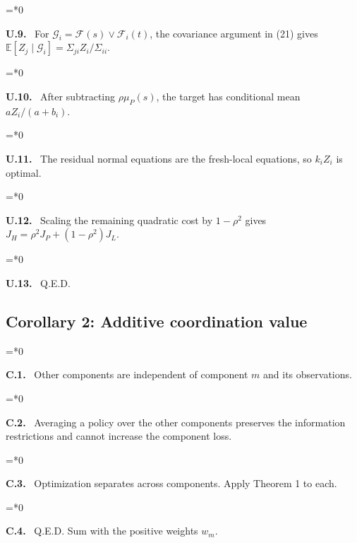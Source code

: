 \documentclass[11pt,letterpaper]{article}
\newcommand{\E}{\mathbb E}
\newenvironment{proofstep}[2]{%
  \begin{list}{}{\leftmargin=\dimexpr 0.17in*#2\relax%
  \setlength{\rightmargin}{0pt}\setlength{\topsep}{5pt}\setlength{\parsep}{2pt}}%
  \item[]\textbf{\textcolor{ink}{#1.}}\ }{\end{list}}
\begin{document}
\begin{proofstep}{U.9}{0}
For $\mathcal G_i=\mathcal F(s)\vee\mathcal F_i(t)$, the covariance argument in (21) gives $\E[Z_j\mid\mathcal G_i]=\Sigma_{ji}Z_i/\Sigma_{ii}$.
\par\nopagebreak{}
\end{proofstep}
\begin{proofstep}{U.10}{0}
After subtracting $\rho\mu_P(s)$, the target has conditional mean $aZ_i/(a+b_i)$.
\par\nopagebreak{}
\end{proofstep}
\begin{proofstep}{U.11}{0}
The residual normal equations are the fresh-local equations, so $k_iZ_i$ is optimal.
\par\nopagebreak{}
\end{proofstep}
\begin{proofstep}{U.12}{0}
Scaling the remaining quadratic cost by $1-\rho^2$ gives $J_H=\rho^2J_P+(1-\rho^2)J_L$.
\par\nopagebreak{}
\end{proofstep}
\begin{proofstep}{U.13}{0}
Q.E.D.
\par\nopagebreak{}
\end{proofstep}
\subsection{Corollary 2: Additive coordination value}
\begin{proofstep}{C.1}{0}
Other components are independent of component $m$ and its observations.
\par\nopagebreak{}
\end{proofstep}
\begin{proofstep}{C.2}{0}
Averaging a policy over the other components preserves the information restrictions and cannot increase the component loss.
\par\nopagebreak{}
\end{proofstep}
\begin{proofstep}{C.3}{0}
Optimization separates across components. Apply Theorem 1 to each.
\par\nopagebreak{}
\end{proofstep}
\begin{proofstep}{C.4}{0}
Q.E.D. Sum with the positive weights $w_m$.
\par\nopagebreak{}
\end{proofstep}
\end{document}
